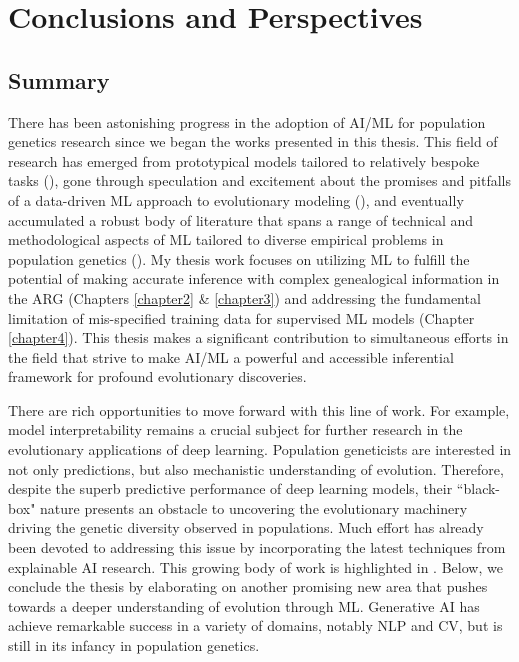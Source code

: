 \chapter{Conclusions and Perspectives} \label{chapter5}

\section{Summary}

There has been astonishing progress in the adoption of \ac{AI}/\ac{ML} for population genetics research since we began the works presented in this thesis. This field of research has emerged from prototypical models tailored to relatively bespoke tasks (\cite{sheehan_deep_2016}), gone through speculation and excitement about the promises and pitfalls of a data-driven \ac{ML} approach to evolutionary modeling (\cite{schrider_supervised_2018}), and eventually accumulated a robust body of literature that spans a range of technical and methodological aspects of \ac{ML} tailored to diverse empirical problems in population genetics (\cite{korfmann_deep_2023,huang_harnessing_2023}). My thesis work focuses on utilizing \ac{ML} to fulfill the potential of making accurate inference with complex genealogical information in the \ac{ARG} (Chapters \ref{chapter2} \& \ref{chapter3}) and addressing the fundamental limitation of mis-specified training data for supervised \ac{ML} models (Chapter \ref{chapter4}). This thesis makes a significant contribution to simultaneous efforts in the field that strive to make \ac{AI}/\ac{ML} a powerful and accessible inferential framework for profound evolutionary discoveries.

There are rich opportunities to move forward with this line of work. For example, model interpretability remains a crucial subject for further research in the evolutionary applications of deep learning. Population geneticists are interested in not only predictions, but also mechanistic understanding of evolution. Therefore, despite the superb predictive performance of deep learning models, their ``black-box" nature presents an obstacle to uncovering the evolutionary machinery driving the genetic diversity observed in populations. Much effort has already been devoted to addressing this issue by incorporating the latest techniques from explainable \ac{AI} research. This growing body of work is highlighted in \cite{novakovsky_obtaining_2023}. Below, we conclude the thesis by elaborating on another promising new area that pushes towards a deeper understanding of evolution through \ac{ML}. Generative \ac{AI} has achieve remarkable success in a variety of domains, notably \ac{NLP} and \ac{CV}, but is still in its infancy in population genetics.

